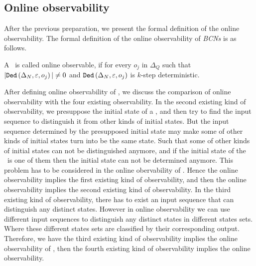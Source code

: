 \subsection{Online observability}
After the previous preparation, we present the formal definition of the online observability. The formal definition of the online observability of {\em BCNs} is as follows.
\begin{definition}
 A \BCN\ is called online observable,
if for every  $o_j$ in $\Delta_Q$ such that $|{\tt Ded}\left(\Delta_N,\varepsilon, o_j\right)|\neq 0$ and ${\tt Ded}\left(\Delta_N,\varepsilon,o_j\right)$ is $k$-step deterministic.
\end{definition}


After defining online observability of \BCNs, we discuss the comparison of online observability with the four existing observability. In the second existing kind of observability, we presuppose the initial state of a \BCN, and then try to find the input sequence to distinguish it from other kinds of initial states. But the input sequence determined by the presupposed initial state may make some of other kinds of initial states turn into be the same state. Such that some of other kinds of initial states can not be distinguished anymore, and if the initial state of the \BCN\ is one of them then the initial state can not be determined anymore. This problem has to be considered in the online obervability of \BCNs. Hence the online observability implies the first existing kind of observability, and then the online observability implies the second existing kind of observability. In the third existing kind of observability, there has to exist an input sequence that can distinguish any distinct states. However in online observability we can use different input sequences to distinguish any distinct states in different states sets. Where these different states sets are classified by their corresponding output. Therefore, we have the third existing kind of observability implies the online observability of \BCNs, then the fourth existing kind of observability implies the online observability.

